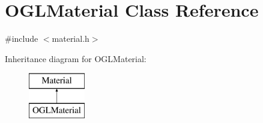 \hypertarget{class_o_g_l_material}{}\section{O\+G\+L\+Material Class Reference}
\label{class_o_g_l_material}


{\ttfamily \#include $<$material.\+h$>$}

Inheritance diagram for O\+G\+L\+Material\+:\begin{figure}[H]
\begin{center}
\leavevmode
\includegraphics[height=2.000000cm]{class_o_g_l_material}
\end{center}
\end{figure}
